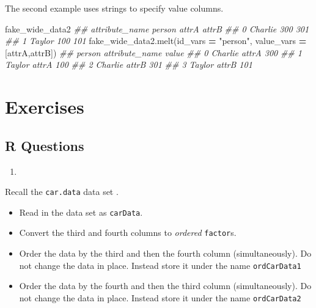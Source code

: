 \documentclass[
  12pt,
  krantz2]{krantz}
\makeatletter
\newenvironment{Shaded}{\begin{snugshade}}{\end{snugshade}}
\newcommand{\CommentTok}[1]{\textcolor[rgb]{0.37,0.37,0.37}{\textit{#1}}}
\newcommand{\NormalTok}[1]{#1}
\newcommand{\OperatorTok}[1]{\textcolor[rgb]{0.43,0.43,0.43}{\textbf{#1}}}
\newcommand{\StringTok}[1]{\textcolor[rgb]{0.5,0.5,0.5}{#1}}
\providecommand{\tightlist}{%
  \setlength{\itemsep}{0pt}\setlength{\parskip}{0pt}}
\newenvironment{kframe}{%
\medskip{}
\setlength{\fboxsep}{.8em}
 \def\at@end@of@kframe{}%
 \ifinner\ifhmode%
  \def\at@end@of@kframe{\end{minipage}}%
  \begin{minipage}{\columnwidth}%
 \fi\fi%
 \def\FrameCommand##1{\hskip\@totalleftmargin \hskip-\fboxsep
 \colorbox{shadecolor}{##1}\hskip-\fboxsep
     \hskip-\linewidth \hskip-\@totalleftmargin \hskip\columnwidth}%
 \MakeFramed {\advance\hsize-\width
   \@totalleftmargin\z@ \linewidth\hsize
   \@setminipage}}%
 {\par\unskip\endMakeFramed%
 \at@end@of@kframe}
\renewenvironment{Shaded}{\begin{kframe}}{\end{kframe}}
\makeatother
\begin{document}
The second example uses strings to specify value columns.

\begin{Shaded}
\begin{Highlighting}[]
\NormalTok{fake\_wide\_data2}
\CommentTok{\#\# attribute\_name   person  attrA  attrB}
\CommentTok{\#\# 0               Charlie    300    301}
\CommentTok{\#\# 1                Taylor    100    101}
\NormalTok{fake\_wide\_data2.melt(id\_vars }\OperatorTok{=} \StringTok{"person"}\NormalTok{, }
\NormalTok{                     value\_vars }\OperatorTok{=}\NormalTok{ [}\StringTok{\textquotesingle{}attrA\textquotesingle{}}\NormalTok{,}\StringTok{\textquotesingle{}attrB\textquotesingle{}}\NormalTok{])}
\CommentTok{\#\#     person attribute\_name  value}
\CommentTok{\#\# 0  Charlie          attrA    300}
\CommentTok{\#\# 1   Taylor          attrA    100}
\CommentTok{\#\# 2  Charlie          attrB    301}
\CommentTok{\#\# 3   Taylor          attrB    101}
\end{Highlighting}
\end{Shaded}

\hypertarget{exercises-10}{%
\section{Exercises}\label{exercises-10}}

\hypertarget{r-questions-9}{%
\subsection{R Questions}\label{r-questions-9}}

\begin{enumerate}
\def\labelenumi{\arabic{enumi}.}
\tightlist
\item
\end{enumerate}

Recall the \texttt{car.data} data set \citep{misc_car_evaluation_19}.

\begin{itemize}
\tightlist
\item
  Read in the data set as \texttt{carData}.
\item
  Convert the third and fourth columns to \emph{ordered} \texttt{factor}s.
\item
  Order the data by the third and then the fourth column (simultaneously). Do not change the data in place. Instead store it under the name \texttt{ordCarData1}
\item
  Order the data by the fourth and then the third column (simultaneously). Do not change the data in place. Instead store it under the name \texttt{ordCarData2}
\end{itemize}
\end{document}
